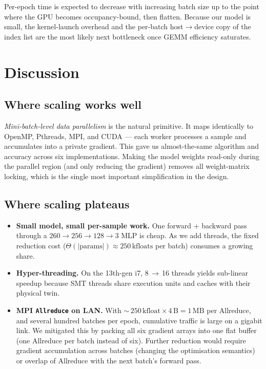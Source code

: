 \documentclass[11pt,a4paper]{article}
\begin{document}
Per-epoch time is expected to decrease with increasing batch size up to
the point where the GPU becomes occupancy-bound, then flatten. Because
our model is small, the kernel-launch overhead and the per-batch
host$\to$device copy of the index list are the most likely next
bottleneck once GEMM efficiency saturates.

\section{Discussion}\label{sec:discussion}

\subsection{Where scaling works well}

\emph{Mini-batch-level data parallelism} is the natural primitive. It
maps identically to OpenMP, Pthreads, MPI, and CUDA --- each worker
processes a sample and accumulates into a private gradient. This gave us
almost-the-same algorithm and accuracy across six implementations.
Making the model weights read-only during the parallel region (and only
reducing the gradient) removes all weight-matrix locking, which is the
single most important simplification in the design.

\subsection{Where scaling plateaus}

\begin{itemize}[noitemsep,topsep=2pt]
  \item \textbf{Small model, small per-sample work.} One forward +
  backward pass through a $260{\to}256{\to}128{\to}3$ MLP is cheap. As we
  add threads, the fixed reduction cost
  (\(\Theta(|\mathrm{params}|)\approx 250\,\mathrm{kfloats}\) per batch)
  consumes a growing share.
  \item \textbf{Hyper-threading.} On the 13th-gen i7, 8\,$\to$\,16 threads
  yields sub-linear speedup because SMT threads share execution units and
  caches with their physical twin.
  \item \textbf{MPI \texttt{Allreduce} on LAN.} With
  \(\sim\,250\,\mathrm{kfloat}\times4\,\mathrm{B} = 1\,\mathrm{MB}\) per
  Allreduce, and several hundred batches per epoch, cumulative traffic is
  large on a gigabit link. We mitigated this by packing all six gradient
  arrays into one flat buffer (one Allreduce per batch instead of six).
  Further reduction would require gradient accumulation across batches
  (changing the optimisation semantics) or overlap of Allreduce with the
  next batch's forward pass.
\end{itemize}
\end{document}
